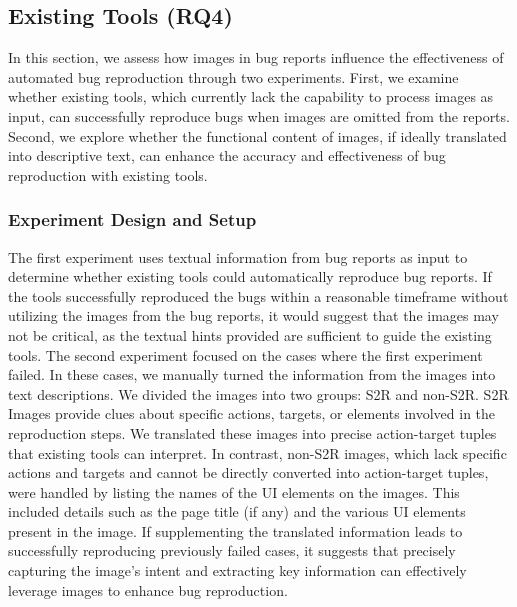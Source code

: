 \subsection{Existing Tools (RQ4)}

In this section, we assess how images in bug reports influence the effectiveness of automated bug reproduction through two experiments. First, we examine whether existing tools, which currently lack the capability to process images as input, can successfully reproduce bugs when images are omitted from the reports. 
Second, we explore whether the functional content of images, if ideally translated into descriptive text, can enhance the accuracy and effectiveness of bug reproduction with existing tools.




%
\subsubsection{Experiment Design and Setup}
The first experiment uses textual information from bug reports as input to determine whether existing tools could automatically reproduce bug reports.  If the tools successfully reproduced the bugs within a reasonable timeframe without utilizing the images from the bug reports, it would suggest that the images may not be critical, as the textual hints provided are sufficient to guide the existing tools. The second experiment focused on the cases where the first experiment failed. In these cases, we manually turned the information from the images into text descriptions. We divided the images into two groups: S2R and non-S2R. S2R Images provide clues about specific actions, targets, or elements involved in the reproduction steps. We translated these images into precise action-target tuples that existing tools can interpret.  In contrast, non-S2R images, which lack specific actions and targets and cannot be directly converted into action-target tuples, were handled by listing the names of the UI elements on the images. This included details such as the page title (if any) and the various UI elements present in the image. If supplementing the translated information leads to successfully reproducing previously failed cases, it suggests that precisely capturing the image’s intent and extracting key information can effectively leverage images to enhance bug reproduction.

